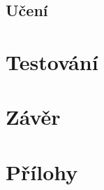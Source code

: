 \section{Učení}



\chapter{Testování}
\label{testovani}
\chapter{Závěr}
\label{zaver}
\chapter{Přílohy}
\label{prilohy}




%
